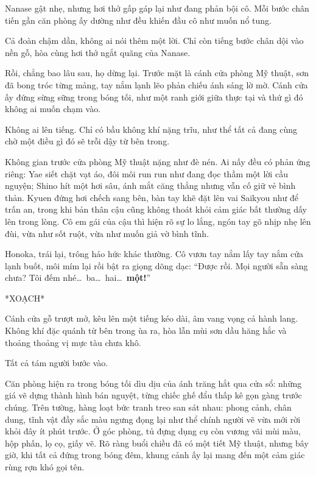 \documentclass[../main.tex]{subfiles}
\begin{document}
Nanase gật nhẹ, nhưng hơi thở gấp gáp lại như đang phản bội cô. Mỗi bước chân tiến gần căn phòng ấy dường như đều khiến đầu cô như muốn nổ tung.

Cả đoàn chậm dần, không ai nói thêm một lời. Chỉ còn tiếng bước chân dội vào nền gỗ, hòa cùng hơi thở ngắt quãng của Nanase.

Rồi, chẳng bao lâu sau, họ dừng lại. Trước mặt là cánh cửa phòng Mỹ thuật, sơn đã bong tróc từng mảng, tay nắm lạnh lẽo phản chiếu ánh sáng lờ mờ. Cánh cửa ấy đứng sừng sững trong bóng tối, như một ranh giới giữa thực tại và thứ gì đó không ai muốn chạm vào.

Không ai lên tiếng. Chỉ có bầu không khí nặng trĩu, như thể tất cả đang cùng chờ một điều gì đó sẽ trỗi dậy từ bên trong.

\ct

Không gian trước cửa phòng Mỹ thuật nặng như đè nén. Ai nấy đều có phản ứng riêng: Yae siết chặt vạt áo, đôi môi run run như đang đọc thầm một lời cầu nguyện; Shino hít một hơi sâu, ánh mắt căng thẳng nhưng vẫn cố giữ vẻ bình thản. Kyuen đứng hơi chếch sang bên, bàn tay khẽ đặt lên vai Saikyou như để trấn an, trong khi bản thân cậu cũng không thoát khỏi cảm giác bất thường dấy lên trong lòng. Cô em gái của cậu thì hiện rõ sự lo lắng, ngón tay gõ nhịp nhẹ lên đùi, vừa như sốt ruột, vừa như muốn giả vờ bình tĩnh.

Honoka, trái lại, trông háo hức khác thường. Cô vươn tay nắm lấy tay nắm cửa lạnh buốt, môi mím lại rồi bật ra giọng dõng dạc: ``Được rồi. Mọi người sẵn sàng chưa? Tôi đếm nhé\dots\ ba\dots\ hai\dots\ \textbf{một!}''

*XOẠCH*

Cánh cửa gỗ trượt mở, kêu lên một tiếng kéo dài, âm vang vọng cả hành lang. Không khí đặc quánh từ bên trong ùa ra, hòa lẫn mùi sơn dầu hăng hắc và thoảng thoảng vị mực tàu chưa khô.

Tất cả tám người bước vào.

Căn phòng hiện ra trong bóng tối dìu dịu của ánh trăng hắt qua cửa sổ: những giá vẽ dựng thành hình bán nguyệt, từng chiếc ghế đẩu thấp kê gọn gàng trước chúng. Trên tường, hàng loạt bức tranh treo san sát nhau: phong cảnh, chân dung, tĩnh vật đầy sắc màu ngưng đọng lại như thể chính người vẽ vừa mới rời khỏi đây ít phút trước. Ở góc phòng, tủ đựng dụng cụ còn vương vãi mùi màu, hộp phấn, lọ cọ, giấy vẽ. Rõ ràng buổi chiều đã có một tiết Mỹ thuật, nhưng bây giờ, khi tất cả đứng trong bóng đêm, khung cảnh ấy lại mang đến một cảm giác rùng rợn khó gọi tên.
\end{document}

